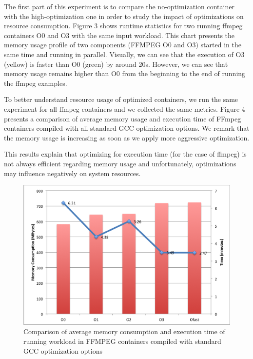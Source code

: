 The first part of this experiment is to compare the no-optimization container with the high-optimization one in order to study the impact of optimizations on resource consumption. Figure 3 shows runtime statistics for two running ffmpeg containers O0 and O3 with the same input workload. This chart presents the memory usage profile of two components (FFMPEG O0 and O3) started in the same time and running in parallel. Visually, we can see that the execution of O3 (yellow) is faster than O0 (green) by around 20s. However, we can see that memory usage remains higher than O0 from the beginning to the end of running the ffmpeg examples. 

To better understand resource usage of optimized containers, we run the same experiment for all ffmpeg containers and we collected the same metrics. Figure 4 presents a comparison of average memory usage and execution time of FFmpeg containers compiled with all standard GCC optimization options. We remark that the memory usage is increasing as soon as we apply more aggressive optimization.

This results explain that optimizing for execution time (for the case of ffmpeg) is not always efficient regarding memory usage and unfortunately, optimizations may influence negatively on system resources. 
\begin{figure}[h]
	\centering
	\includegraphics[scale=0.4]{Ressources/infra_ffmpeg_plot1.png}
	\caption{Comparison of average memory consumption and execution time of running workload in FFMPEG containers compiled with standard GCC optimization options}
\end{figure}






